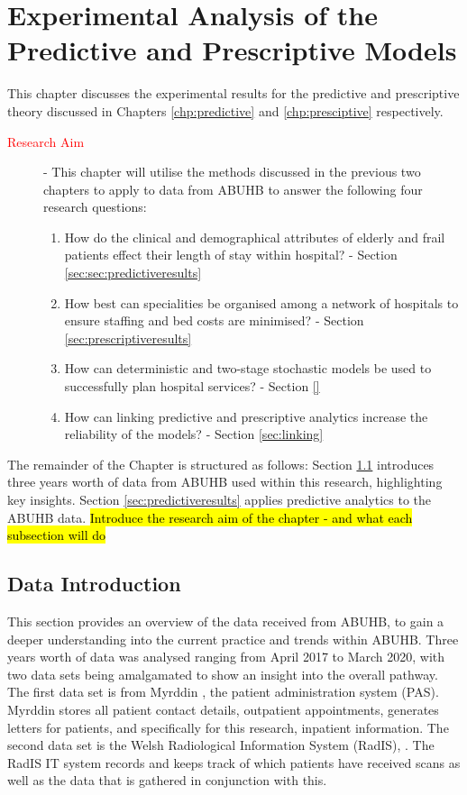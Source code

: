 \documentclass[../thesis.tex]{subfiles}
\begin{document}
\chapter{Experimental Analysis of the Predictive and Prescriptive Models}\label{chp:Experimental Analysis}
This chapter discusses the experimental results for the predictive and prescriptive theory discussed in Chapters \ref{chp:predictive} and \ref{chp:presciptive} respectively.

\begin{description}
\item[\textcolor{red}{Research Aim}] - This chapter will utilise the methods discussed in the previous two chapters to apply to data from ABUHB to answer the following four research questions:
\begin{enumerate}
    \item How do the clinical and demographical attributes of elderly and frail patients effect their length of stay within hospital? - Section \ref{sec:sec:predictiveresults}
    \item How best can specialities be organised among a network of hospitals to ensure staffing and bed costs are minimised? - Section \ref{sec:prescriptiveresults}
    \item How can deterministic and two-stage stochastic models be used to successfully plan hospital services? - Section \ref{}%
    \item How can linking predictive and prescriptive analytics increase the reliability of the models? - Section \ref{sec:linking}
\end{enumerate}
\end{description}

The remainder of the Chapter is structured as follows: Section \ref{sec:dataintroduction} introduces three years worth of data from ABUHB used within this research, highlighting key insights. Section \ref{sec:predictiveresults} applies predictive analytics to the ABUHB data.
\hl{Introduce the research aim of the chapter - and what each subsection will do}

\section{Data Introduction} \label{sec:dataintroduction}
This section provides an overview of the data received from ABUHB, to gain a deeper understanding into the current practice and trends within ABUHB. Three years worth of data was analysed ranging from April 2017 to March 2020, with two data sets being amalgamated to show an insight into the overall pathway. The first data set is from Myrddin \cite{WAO2018}, the patient administration system (PAS). Myrddin stores all patient contact details, outpatient appointments, generates letters for patients, and specifically for this research, inpatient information. The second data set is the Welsh Radiological Information System (RadIS), \cite{WAO2018}. The RadIS IT system records and keeps track of which patients have received scans as well as the data that is gathered in conjunction with this.
\end{document}
